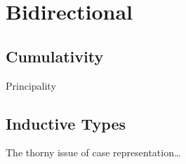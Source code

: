 \chapter{Bidirectional }
\label{chap:bidir-pcuic}

\section{Cumulativity}
\label{sec:cumulativity}

Principality

\section{Inductive Types}
\label{sec:inductives}

The thorny issue of case representation…